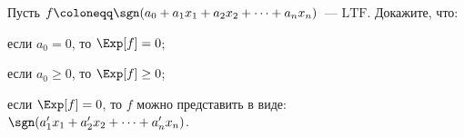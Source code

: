 Пусть $f \coloneqq \sgn(a_0 + a_1 x_1 + a_2 x_2 + \dots + a_n x_n)$~--- $\mathrm{LTF}$.
Докажите, что:
\begin{enumcyr}
    \item если $a_0 = 0$, то $\Exp[f] = 0$;
    \item если $a_0 \ge 0$, то $\Exp[f] \ge 0$;
    \item если $\Exp[f] = 0$, то $f$ можно представить в виде: $\sgn(a'_1 x_1 + a'_2 x_2 + \dots + a'_n
        x_n)$.
\end{enumcyr}